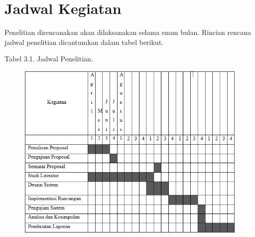 \documentclass{jtetiproposalskripsi}
\begin{document}
\section{Jadwal Kegiatan}
Penelitian direncanakan akan dilaksanakan selama enam bulan. Rincian rencana jadwal penelitian dicantumkan dalam tabel berikut.

\begin{center}
Tabel 3.1. Jadwal Penelitian.
\end{center}
\vspace{-0.5cm}
\begin{figure}[ht!]
  \centering
    \includegraphics[width=13cm]{gambar/jadwal}
\end{figure}

\end{document}
